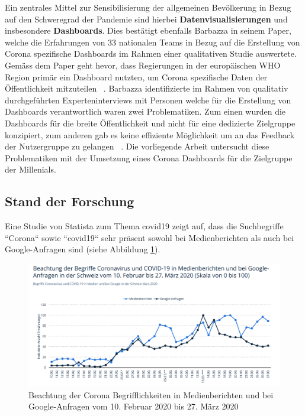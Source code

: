 Ein zentrales Mittel zur Sensibilisierung der allgemeinen Bevölkerung in Bezug auf den Schweregrad der Pandemie sind hierbei \textbf{Datenvisualisierungen} und insbesondere \textbf{Dashboards}. Dies bestätigt ebenfalls Barbazza in seinem Paper, welche die Erfahrungen von 33 nationalen Teams in Bezug auf die Erstellung von Corona spezifische Dashboards im Rahmen einer qualitativen Studie auswertete. Gemäss dem Paper geht hevor, dass Regierungen in der europäischen WHO Region primär ein Dashboard nutzten, um Corona spezifische Daten der Öffentlichkeit mitzuteilen ~\citep[S. 2]{barbazza}. Barbazza identifizierte im Rahmen von qualitativ durchgeführten Experteninterviews mit Personen welche für die Erstellung von Dashboards verantwortlich waren zwei Problematiken. Zum einen wurden die Dashboards für die breite Öffentlichkeit und nicht für eine dedizierte Zielgruppe konzipiert, zum anderen gab es keine effiziente Möglichkeit um an das Feedback der Nutzergruppe zu gelangen ~\citep[S. 14-15]{barbazza}. Die vorliegende Arbeit untersucht diese Problematiken mit der Umsetzung eines Corona Dashboards für die Zielgruppe der Millenials.


\subsection{Stand der Forschung}
 Eine Studie von Statista zum Thema \gls{covid19} zeigt auf, dass die Suchbegriffe ``Corona`` sowie  ``\gls{covid19}`` sehr präsent sowohl bei Medienberichten als auch bei Google-Anfragen sind (siehe Abbildung \ref{fig:covid_term_public_media_presence}).
 
\begin{figure}[h]
    \includegraphics[width=12cm]{images/covid_term_public_media_presence.png}
    \centering
    \caption{Beachtung der Corona Begrifflichkeiten in Medienberichten und bei Google-Anfragen vom 10. Februar 2020 bis 27. März 2020 ~\citep[S. 50]{covid_term_public_media_presence}}
    \label{fig:covid_term_public_media_presence}
\end{figure}
 
